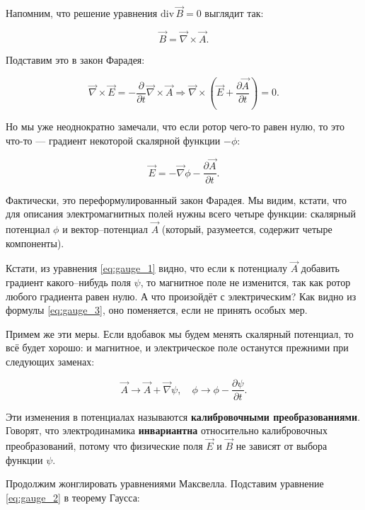 \documentclass[12pt,a4paper]{article}
\numberwithin{equation}{section}
\numberwithin{equation}{section}
\newcommand{\pt}{\partial}
\renewcommand{\div}{\mathrm{div}\,}
\newcommand{\vn}{\vec{\nabla}}
\begin{document}
Напомним, что решение уравнения $\div \vec{B} = 0$ выглядит так: 

\begin{equation}
  \label{eq:gauge_1}
  \vec{B} = \vn \times \vec{A}.
\end{equation}

Подставим это в закон Фарадея:

\begin{equation}
  \label{eq:gauge_2}
  \vn \times \vec{E} = - \frac{\pt}{\pt t} \vn \times \vec{A}
  \Rightarrow \vn \times \left( \vec{E} + \frac{\pt \vec{A}}{\pt t}
  \right) = 0.
\end{equation}

Но мы уже неоднократно замечали, что если ротор чего-то равен нулю, то
это что-то --- градиент некоторой скалярной функции $-\phi$:

\begin{equation}
  \label{eq:gauge_3}
  \vec{E} = - \vn \phi - \frac{\pt \vec{A}}{\pt t}.
\end{equation}

Фактически, это переформулированный закон Фарадея. Мы видим, кстати,
что для описания электромагнитных полей нужны всего четыре функции:
скалярный потенциал $\phi$ и вектор--потенциал $\vec{A}$ (который,
разумеется, содержит четыре компоненты). 

Кстати, из уравнения \eqref{eq:gauge_1} видно, что если к потенциалу
$\vec{A}$ добавить градиент какого--нибудь поля $\psi$, то магнитное
поле не изменится, так как ротор любого градиента равен нулю. А что
произойдёт с электрическим? Как видно из формулы \eqref{eq:gauge_3},
оно поменяется, если не принять особых мер. 

Примем же эти меры. Если вдобавок мы будем менять скалярный потенциал,
то всё будет хорошо: и магнитное, и электрическое поле останутся
прежними при следующих заменах:

\begin{equation}
  \label{eq:gauge_transform}
  \vec{A} \to \vec{A} + \vn \psi, \quad \phi \to \phi - \frac{\pt
    \psi}{\pt t}.
\end{equation}

Эти изменения в потенциалах называются \textbf{калибровочными
  преобразованиями}. Говорят, что электродинамика \textbf{инвариантна}
относительно калибровочных преобразований, потому что физические поля
$\vec{E}$ и $\vec{B}$ не зависят от выбора функции $\psi$. 

Продолжим жонглировать уравнениями Максвелла. Подставим уравнение
\eqref{eq:gauge_2} в теорему Гаусса:
\end{document}
